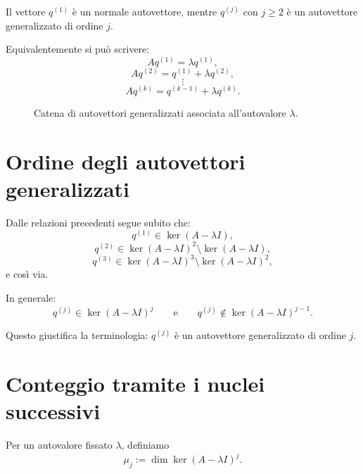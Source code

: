 Il vettore $q^{(1)}$ è un normale autovettore, mentre $q^{(j)}$ con $j\ge 2$ è un autovettore generalizzato di ordine $j$.

Equivalentemente si può scrivere:
\[
Aq^{(1)} = \lambda q^{(1)},
\]
\[
Aq^{(2)} = q^{(1)} + \lambda q^{(2)},
\]
\[
\vdots
\]
\[
Aq^{(k)} = q^{(k-1)} + \lambda q^{(k)}.
\]

\begin{figure}[H]
\centering
{}
\caption{Catena di autovettori generalizzati associata all'autovalore $\lambda$.}
\end{figure}

\section{Ordine degli autovettori generalizzati}

Dalle relazioni precedenti segue subito che:
\[
q^{(1)} \in \ker(A-\lambda I),
\]
\[
q^{(2)} \in \ker(A-\lambda I)^2 \setminus \ker(A-\lambda I),
\]
\[
q^{(3)} \in \ker(A-\lambda I)^3 \setminus \ker(A-\lambda I)^2,
\]
e così via.

In generale:
\begin{equation}
q^{(j)} \in \ker(A-\lambda I)^j
\qquad \text{e} \qquad
q^{(j)} \notin \ker(A-\lambda I)^{j-1}.
\label{eq:L8_order}
\end{equation}

Questo giustifica la terminologia: $q^{(j)}$ è un autovettore generalizzato di ordine $j$.

\section{Conteggio tramite i nuclei successivi}

Per un autovalore fissato $\lambda$, definiamo
\begin{equation}
\mu_j := \dim \ker(A-\lambda I)^j.
\label{eq:L8_mu_j}
\end{equation}

